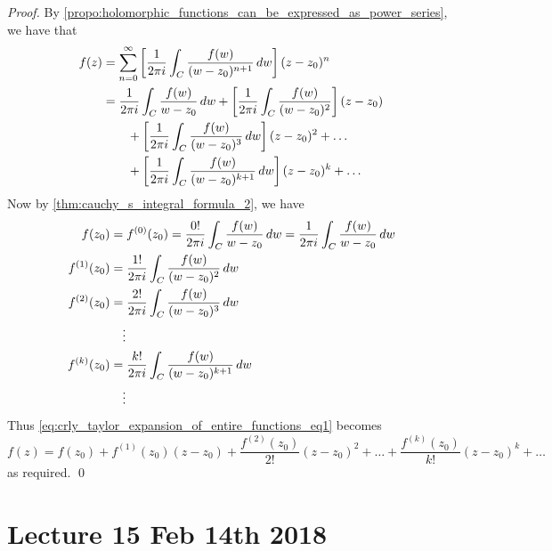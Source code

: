 \documentclass[11pt, oneside]{book}
\begin{document}
\begin{proof}
	By \cref{propo:holomorphic_functions_can_be_expressed_as_power_series}, we have that
	\begin{align}
		f(z) &= \sum_{n=0}^{\infty} \left[ \frac{1}{2 \pi i} \int_{C} \frac{f(w)}{(w - z_0)^{n + 1}} \mathop{}\!d{w} \right] (z - z_0)^n \nonumber \\
			&= \frac{1}{2 \pi i} \int_{C} \frac{f(w)}{w - z_0} \mathop{}\!d{w} + \left[ \frac{1}{2 \pi i} \int_{C} \frac{f(w)}{(w - z_0)^2} \right](z - z_0) \label{eq:crly_taylor_expansion_of_entire_functions_eq1} \\
			&\quad\quad + \left[ \frac{1}{2 \pi i} \int_{C} \frac{f(w)}{(w - z_0)^3} \mathop{}\!d{w} \right] (z - z_0)^2 + \hdots \nonumber \\
			&\quad\quad + \left[ \frac{1}{2 \pi i} \int_{C} \frac{f(w)}{(w - z_0)^{k + 1}} \mathop{}\!d{w} \right] (z - z_0)^k + \hdots \nonumber
	\end{align}
	Now by \cref{thm:cauchy_s_integral_formula_2}, we have
	\begin{align*}
		f(z_0) &= f^{(0)}(z_0) = \frac{0!}{2 \pi i} \int_{C} \frac{f(w)}{w - z_0} \mathop{}\!d{w} = \frac{1}{2 \pi i} \int_{C} \frac{f(w)}{w - z_0} \mathop{}\!d{w} \\
		f^{(1)}(z_0) &= \frac{1!}{2 \pi i} \int_{C} \frac{f(w)}{(w - z_0)^2} \mathop{}\!d{w} \\
		f^{(2)}(z_0) &= \frac{2!}{2 \pi i} \int_{C} \frac{f(w)}{(w - z_0)^3} \mathop{}\!d{w} \\
		&\quad\vdots \\
		f^{(k)}(z_0) &= \frac{k!}{2 \pi i} \int_{C} \frac{f(w)}{(w - z_0)^{k + 1}} \mathop{}\!d{w} \\
		&\quad\vdots
	\end{align*}
	Thus \cref{eq:crly_taylor_expansion_of_entire_functions_eq1} becomes
	\begin{equation*}
		f(z) = f(z_0) + f^{(1)}(z_0)(z - z_0) + \frac{f^{(2)}(z_0)}{2!} (z - z_0)^2 + \hdots + \frac{f^{(k)}(z_0)}{k!} (z - z_0)^k + \hdots
	\end{equation*}
	as required. \qed
\end{proof}



\chapter{Lecture 15 Feb 14th 2018} %
\label{cha:lecture_15_feb_14th_2018}
\end{document}
